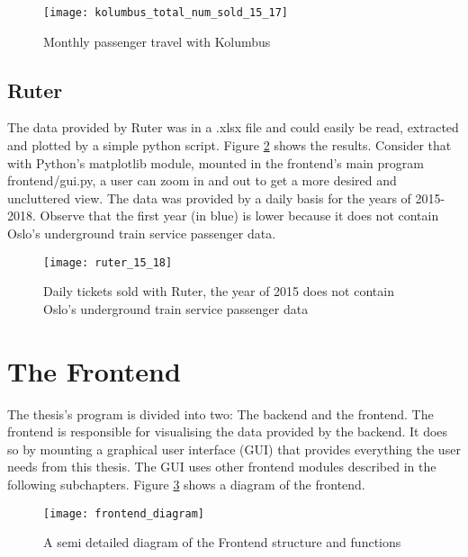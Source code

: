 \begin{figure}[!htb]
\texttt{[image: kolumbus\_total\_num\_sold\_15\_17]}
\centering
\caption{Monthly passenger travel with Kolumbus}
\label{fig:kolumbus_15_17}
\end{figure}







\subsection{Ruter}
The data provided by Ruter was in a .xlsx file and could easily be read, extracted and plotted by a simple python script. Figure \ref{fig:ruter_15_18} shows the results. Consider that with Python's matplotlib module, mounted in the frontend's main program frontend/gui.py, a user can zoom in and out to get a more desired and uncluttered view. The data was provided by a daily basis for the years of 2015-2018. Observe that the first year (in blue) is lower because it does not contain Oslo's underground train service passenger data.

\begin{figure}[!htb]
\texttt{[image: ruter\_15\_18]}
\centering
\caption{Daily tickets sold with Ruter, the year of 2015 does not contain Oslo's underground train service passenger data}
\label{fig:ruter_15_18}
\end{figure}

\newpage










\section{The Frontend}
The thesis's program is divided into two: The backend and the frontend. The frontend is responsible for visualising the data provided by the backend. It does so by mounting a graphical user interface (GUI) that provides everything the user needs from this thesis. The GUI uses other frontend modules described in the following subchapters. Figure \ref{fig:frontend_diagram} shows a diagram of the frontend.

\begin{figure}[h]
\texttt{[image: frontend\_diagram]}
\centering
\caption{A semi detailed diagram of the Frontend structure and functions}
\label{fig:frontend_diagram}
\end{figure}

